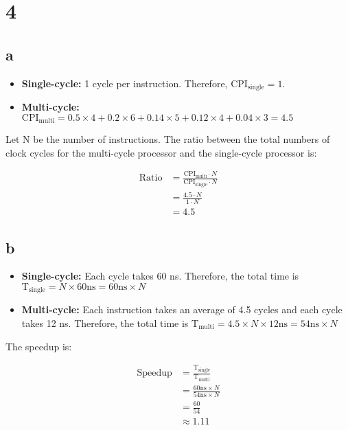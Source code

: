 \documentclass[12pt]{article}
\begin{document}
\section*{4}

\subsection*{a}

\begin{itemize}
    \item \textbf{Single-cycle:} 1 cycle per instruction. Therefore, $\mathrm{CPI}_\mathrm{single}=1$.
    \item \textbf{Multi-cycle:} $\mathrm{CPI}_\mathrm{multi}=0.5 \times 4 + 0.2 \times 6 + 0.14 \times 5 + 0.12 \times 4 + 0.04 \times 3 = 4.5$
\end{itemize}

Let N be the number of instructions. The ratio between the total numbers of clock cycles for the multi-cycle processor and the single-cycle processor is:

\begin{align*}
\mathrm{Ratio} &= \frac{\mathrm{CPI}_\mathrm{multi} \cdot N}{\mathrm{CPI}_\mathrm{single} \cdot N} \\
&= \frac{4.5 \cdot N}{1 \cdot N} \\
&= 4.5
\end{align*}

\subsection*{b}

\begin{itemize}
    \item \textbf{Single-cycle:} Each cycle takes 60 ns. Therefore, the total time is $\mathrm{T}_\mathrm{single} = N \times 60 \text{ns} = 60 \text{ns} \times N$
    \item \textbf{Multi-cycle:} Each instruction takes an average of 4.5 cycles and each cycle takes 12 ns. Therefore, the total time is $\mathrm{T}_\mathrm{multi} = 4.5 \times N \times 12 \text{ns} = 54 \text{ns} \times N$
\end{itemize}

The speedup is:

\begin{align*}
\mathrm{Speedup} &= \frac{\mathrm{T}_\mathrm{single}}{\mathrm{T}_\mathrm{multi}} \\
&= \frac{60 \text{ns} \times N}{54 \text{ns} \times N} \\
&= \frac{60}{54} \\
&\approx 1.11
\end{align*}
\end{document}
